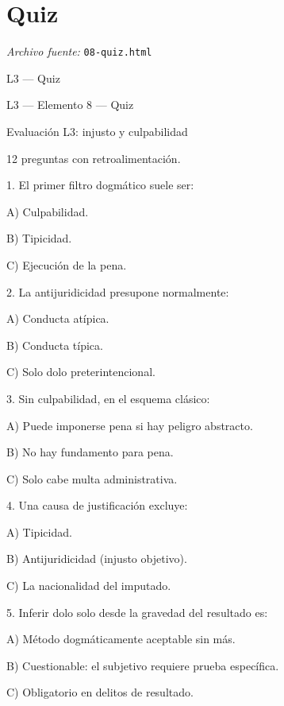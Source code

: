 \documentclass[11pt,a4paper]{article}
\begin{document}
\section{Quiz}
\noindent\textit{Archivo fuente:} \texttt{08-quiz.html}

L3 — Quiz\par





    L3 — Elemento 8 — Quiz\par
    Evaluación L3: injusto y culpabilidad\par

    12 preguntas con retroalimentación.\par


      1. El primer filtro dogmático suele ser:\par

         A) Culpabilidad.\par
         B) Tipicidad.\par
         C) Ejecución de la pena.\par


      2. La antijuridicidad presupone normalmente:\par

         A) Conducta atípica.\par
         B) Conducta típica.\par
         C) Solo dolo preterintencional.\par


      3. Sin culpabilidad, en el esquema clásico:\par

         A) Puede imponerse pena si hay peligro abstracto.\par
         B) No hay fundamento para pena.\par
         C) Solo cabe multa administrativa.\par


      4. Una causa de justificación excluye:\par

         A) Tipicidad.\par
         B) Antijuridicidad (injusto objetivo).\par
         C) La nacionalidad del imputado.\par


      5. Inferir dolo solo desde la gravedad del resultado es:\par

         A) Método dogmáticamente aceptable sin más.\par
         B) Cuestionable: el subjetivo requiere prueba específica.\par
         C) Obligatorio en delitos de resultado.\par
\end{document}
